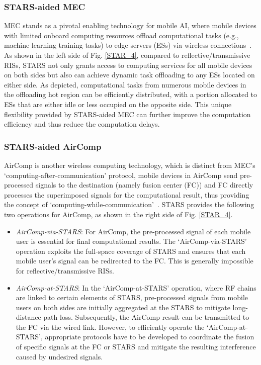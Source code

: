 \documentclass[journal]{IEEEtran}
\theoremstyle{definition}
\begin{document}
\subsubsection{STARS-aided MEC}
MEC stands as a pivotal enabling technology for mobile AI, where mobile devices with limited onboard computing resources offload computational tasks (e.g., machine learning training tasks) to edge servers (ESs) via wireless connections~\cite{8016573}. As shown in the left side of Fig. \ref{STAR_4}, compared to reflective/transmissive RISs, STARS not only grants access to computing services for all mobile devices on both sides but also can achieve dynamic task offloading to any ESs located on either side. As depicted, computational tasks from numerous mobile devices in the offloading hot region can be efficiently distributed, with a portion allocated to ESs that are either idle or less occupied on the opposite side. This unique flexibility provided by STARS-aided MEC can further improve the computation efficiency and thus reduce the computation delays.



\subsubsection{STARS-aided AirComp} AirComp is another wireless computing technology, which is distinct from MEC's `computing-after-communication' protocol, mobile devices in AirComp send pre-processed signals to the destination (namely fusion center (FC)) and FC directly processes the superimposed signals for the computational result, thus providing the concept of `computing-while-communication'~\cite{9095231}. STARS provides the following two operations for AirComp, as shown in the right side of Fig. \ref{STAR_4}.

\begin{itemize}	
	\item \emph{AirComp-via-STARS}: For AirComp, the pre-processed signal of each mobile user is essential for final computational results. The `AirComp-via-STARS' operation exploits the full-space coverage of STARS and ensures that each mobile user's signal can be redirected to the FC. This is generally impossible for reflective/transmissive RISs.
    \item  \emph{AirComp-at-STARS}: In the `AirComp-at-STARS' operation, where RF chains are linked to certain elements of STARS, pre-processed signals from mobile users on both sides are initially aggregated at the STARS to mitigate long-distance path loss. Subsequently, the AirComp result can be transmitted to the FC via the wired link. However, to efficiently operate the `AirComp-at-STARS', appropriate protocols have to be developed to coordinate the fusion of specific signals at the FC or STARS and mitigate the resulting interference caused by undesired signals.
\end{itemize}
\end{document}
